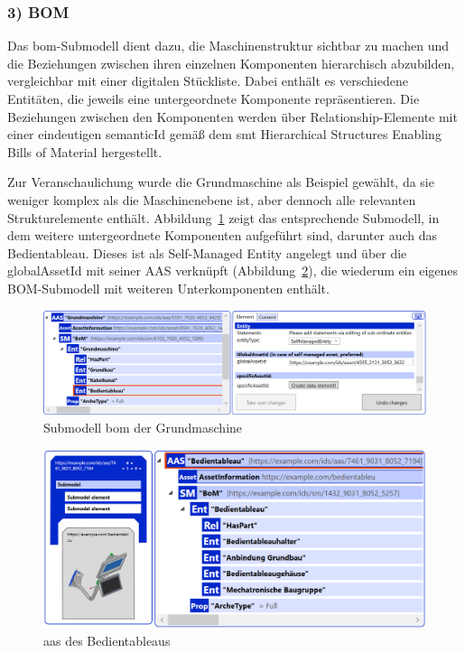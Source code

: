 \subsubsection*{3) BOM}
\vspace{-0.5em}

Das \acs{bom}-Submodell dient dazu, die Maschinenstruktur sichtbar zu machen und die Beziehungen zwischen ihren einzelnen Komponenten hierarchisch abzubilden, vergleichbar mit einer digitalen Stückliste.
Dabei enthält es verschiedene Entitäten, die jeweils eine untergeordnete Komponente repräsentieren.
Die Beziehungen zwischen den Komponenten werden über Relationship-Elemente mit einer eindeutigen semanticId gemäß dem \acs{smt} Hierarchical Structures Enabling Bills of Material \cite{SpezifikationHierachischeStrukturen} hergestellt.

Zur Veranschaulichung wurde die Grundmaschine als Beispiel gewählt, da sie weniger komplex als die Maschinenebene ist, aber dennoch alle relevanten Strukturelemente enthält.
Abbildung~\ref{fig:BOMSubmodelGrundmashcine} zeigt das entsprechende Submodell, in dem weitere untergeordnete Komponenten aufgeführt sind, darunter auch das Bedientableau.
Dieses ist als Self-Managed Entity angelegt und über die globalAssetId mit seiner AAS verknüpft (Abbildung~\ref{fig:AASBedientableau}), die wiederum ein eigenes BOM-Submodell mit weiteren Unterkomponenten enthält.

\begin{figure}[htbp]
    \centering
        \includegraphics[width=1\textwidth]{Bilder/ErgebnissePackageExplorer/AASGrundmaschine.PNG}
    \caption{Submodell \acs{bom} der Grundmaschine}
    \label{fig:BOMSubmodelGrundmashcine}
\end{figure}

\begin{figure}[htbp]
    \centering
        \includegraphics[width=1\textwidth]{Bilder/ErgebnissePackageExplorer/BedientableauTest.PNG}
    \caption{\acs{aas} des Bedientableaus}
    \label{fig:AASBedientableau}
\end{figure}


